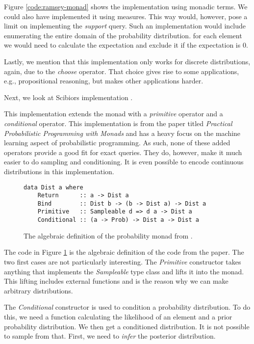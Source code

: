 Figure \ref{code:ramsey-monad} shows the implementation using monadic terms. We
could also have implemented it using measures. This way would, however, 
pose a limit on implementing the \emph{support} query. Such an implementation
would include enumerating the entire domain of the probability distribution. for
each element we would need to calculate the expectation and exclude it if the
expectation is 0.

Lastly, we mention that this implementation only works for discrete
distributions, again, due to the \emph{choose} operator. That choice gives
rise to some applications, e.g., propositional reasoning, but makes other applications
harder.

Next, we look at Scibiors implementation \cite{Scibior:2015}.

This implementation extends the monad with a \emph{primitive} operator and
a \emph{conditional} operator. This implementation is from the paper titled
\emph{Practical Probabilistic Programming with Monads} and has a heavy focus
on the machine learning aspect of probabilistic programming. As such, none of these
added operators provide a good fit for exact queries. They do, however, make it
much easier to do sampling and conditioning. It is even possible to encode
continuous distributions in this implementation.

\begin{figure}[H]
\begin{verbatim}
data Dist a where
    Return      :: a -> Dist a
    Bind        :: Dist b -> (b -> Dist a) -> Dist a
    Primitive   :: Sampleable d => d a -> Dist a
    Conditional :: (a -> Prob) -> Dist a -> Dist a
\end{verbatim}
\caption{The algebraic definition of the probability monad from \cite{Scibior:2015}.}
\label{code:scibior-monad}
\end{figure}

The code in Figure \ref{code:scibior-monad} is the algebraic definition of the code
from the paper. The two first cases are not particularly interesting.
The \emph{Primitive} constructor takes anything that implements the \emph{Sampleable}
type class and lifts it into the monad. This lifting includes external functions
and is the reason why we can make arbitrary distributions.

The \emph{Conditional} constructor is used to condition a probability distribution.
To do this,
we need a function calculating the likelihood of an element and a prior
probability distribution.
We then get a conditioned distribution. It is not possible to sample from that.
First, we need to \emph{infer} the posterior distribution.

